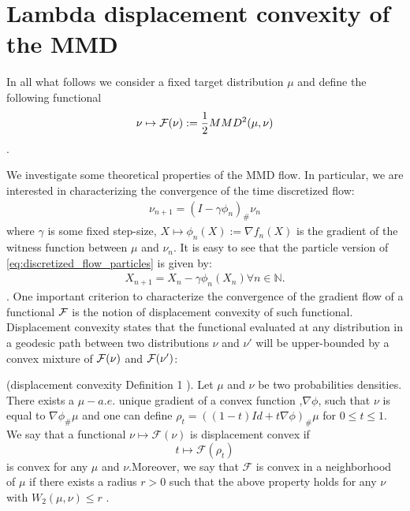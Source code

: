 


\section{Lambda displacement convexity of the MMD}
In all what follows we consider a fixed target distribution $\mu$ and define the following functional 
\begin{align}\label{eq:MMD_functional}
	\nu \mapsto {{\mathcal F}}(\nu):=\frac{1}{2} MMD^2(\mu,\nu)
\end{align}. 

We investigate some theoretical properties of the MMD flow. In particular, we are interested in characterizing the convergence of the time discretized flow:
	\begin{align}\label{eq:discretized_flow}
		\nu_{n+1} = (I -\gamma \phi_n)_{\#}\nu_n
	\end{align}
where $\gamma$ is some fixed step-size, $X \mapsto \phi_n(X):=\nabla f_{n}(X)$ is the gradient of the witness function between $\mu$ and $\nu_n$. It is easy to see that the particle version of \cref{eq:discretized_flow_particles} is given by:
\begin{align}
	X_{n+1} = X_n - \gamma \phi_n(X_n) \forall n\in \mathbb{N}.
\end{align}. 
One important criterion to characterize the convergence of the gradient flow of a functional ${{\mathcal F}}$ is the notion of displacement convexity of such functional. Displacement convexity states that the functional evaluated at any distribution in a geodesic path between two distributions $\nu$ and $\nu'$ will be upper-bounded by a convex mixture of ${{\mathcal F}}(\nu)$ and ${{\mathcal F}}(\nu')$:
\begin{definition}
(displacement convexity \cite{Villani:2004} Definition 1 ). Let $\mu$
and $\nu$ be two probabilities densities. There exists a $\mu-a.e.$
unique gradient of a convex function ,$\nabla\phi$, such that $\nu$
is equal to $\nabla\phi_{\#}\mu$ and one can define $\rho_{t}=((1-t)Id+t\nabla\phi)_{\#}\mu$
for $0\leq t\leq1$. We say that a functional $\nu\mapsto\mathcal{F}(\nu)$
is displacement convex if 
\[
t\mapsto\mathcal{F}(\rho_{t})
\]
 is convex for any $\mu$ and $\nu$.Moreover, we say that $\mathcal{F}$
is convex in a neighborhood of $\mu$ if there exists a radius $r>0$
such that the above property holds for any $\nu$ with $W_{2}(\mu,\nu)\leq r$
.
\end{definition}


